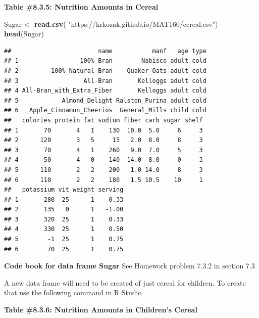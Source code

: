 \documentclass[
]{book}
\newenvironment{Shaded}{\begin{snugshade}}{\end{snugshade}}
\newcommand{\KeywordTok}[1]{\textcolor[rgb]{0.13,0.29,0.53}{\textbf{#1}}}
\newcommand{\NormalTok}[1]{#1}
\newcommand{\OperatorTok}[1]{\textcolor[rgb]{0.81,0.36,0.00}{\textbf{#1}}}
\newcommand{\StringTok}[1]{\textcolor[rgb]{0.31,0.60,0.02}{#1}}
\begin{document}
\textbf{Table \#8.3.5: Nutrition Amounts in Cereal}

\begin{Shaded}
\begin{Highlighting}[]
\NormalTok{Sugar <-}\StringTok{ }\KeywordTok{read.csv}\NormalTok{(}
  \StringTok{"https://krkozak.github.io/MAT160/cereal.csv"}\NormalTok{)}
\KeywordTok{head}\NormalTok{(Sugar)}
\end{Highlighting}
\end{Shaded}

\begin{verbatim}
##                        name           manf   age type
## 1                 100%_Bran        Nabisco adult cold
## 2         100%_Natural_Bran    Quaker_Oats adult cold
## 3                  All-Bran       Kelloggs adult cold
## 4 All-Bran_with_Extra_Fiber       Kelloggs adult cold
## 5            Almond_Delight Ralston_Purina adult cold
## 6   Apple_Cinnamon_Cheerios  General_Mills child cold
##   colories protein fat sodium fiber carb sugar shelf
## 1       70       4   1    130  10.0  5.0     6     3
## 2      120       3   5     15   2.0  8.0     8     3
## 3       70       4   1    260   9.0  7.0     5     3
## 4       50       4   0    140  14.0  8.0     0     3
## 5      110       2   2    200   1.0 14.0     8     3
## 6      110       2   2    180   1.5 10.5    10     1
##   potassium vit weight serving
## 1       280  25      1    0.33
## 2       135   0      1   -1.00
## 3       320  25      1    0.33
## 4       330  25      1    0.50
## 5        -1  25      1    0.75
## 6        70  25      1    0.75
\end{verbatim}

\textbf{Code book for data frame Sugar} See Homework problem 7.3.2 in section 7.3

A new data frame will need to be created of just cereal for children. To create that use the following command in R Studio

\textbf{Table \#8.3.6: Nutrition Amounts in Children's Cereal}

\begin{Shaded}
\end{Shaded}
\end{document}
